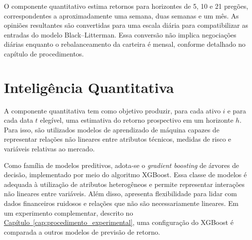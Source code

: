 O componente quantitativo estima retornos para horizontes de
5, 10 e 21 pregões, correspondentes a aproximadamente uma semana,
duas semanas e um mês. As opiniões resultantes são convertidas
para uma escala diária para compatibilizar as entradas do modelo
Black--Litterman. Essa conversão não implica negociações diárias enquanto o rebalanceamento da carteira é mensal, conforme detalhado no capítulo de procedimentos.

\section{Inteligência Quantitativa}
\label{sec:inteligencia_quantitativa}

A componente quantitativa tem como objetivo produzir, para cada ativo $i$ e para cada data $t$ elegível, uma estimativa do retorno prospectivo em um horizonte $h$. Para isso, são utilizados modelos de aprendizado de máquina capazes de representar relações não lineares entre atributos técnicos, medidas de risco e variáveis relativas ao mercado.

Como família de modelos preditivos, adota-se o \textit{gradient boosting} de árvores de decisão, implementado por meio do algoritmo XGBoost. Essa classe de modelos é adequada à utilização de atributos heterogêneos e permite representar interações não lineares entre variáveis. Além disso, apresenta flexibilidade para lidar com dados financeiros ruidosos e relações que não são necessariamente lineares. Em um experimento complementar, descrito no \hyperref[cap:procedimento_experimental]{Capítulo~\ref*{cap:procedimento_experimental}}, uma configuração do XGBoost é comparada a outros modelos de previsão de retorno.


